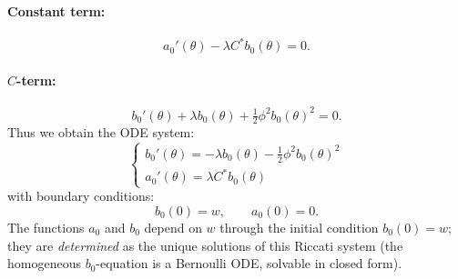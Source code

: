 \documentclass[12pt,a4paper]{article}
\begin{document}
\paragraph{Constant term:}
\[
a_0'(\theta) - \lambda C^* b_0(\theta) = 0.
\]
\paragraph{$C$-term:}
\[
b_0'(\theta) + \lambda b_0(\theta) + \tfrac{1}{2}\phi^2 b_0(\theta)^2 = 0.
\]
Thus we obtain the ODE system:
\begin{equation*}
    \boxed{
    \begin{cases}
        b_0'(\theta) = -\lambda b_0(\theta) - \tfrac{1}{2}\phi^2 b_0(\theta)^2 \\
        a_0'(\theta) = \lambda C^* b_0(\theta)
    \end{cases}
    }
\end{equation*}
with boundary conditions:
\[
b_0(0) = w, \qquad a_0(0) = 0.
\]
The functions $a_0$ and $b_0$ depend on $w$ through the initial condition $b_0(0) = w$; they are \emph{determined} as the unique solutions of this Riccati system (the homogeneous $b_0$-equation is a Bernoulli ODE, solvable in closed form).
\end{document}
